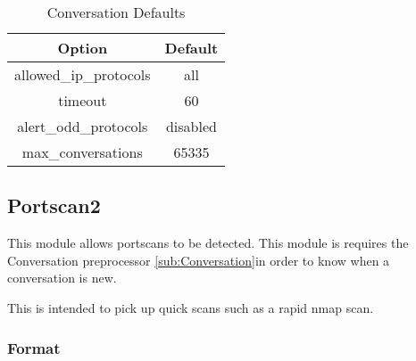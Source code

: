 \documentclass[english]{report}
\begin{document}
\begin{table}[!hbpt]

\caption{Conversation Defaults\label{conversation defaults}}

\begin{center}\begin{tabular}{|c|c|}
\hline 
Option&
Default\\
\hline
\hline 
allowed\_ip\_protocols&
all\\
\hline 
timeout&
60\\
\hline 
alert\_odd\_protocols&
disabled\\
\hline 
max\_conversations&
65335\\
\hline
\end{tabular}\end{center}
\end{table}

\subsection{Portscan2\label{sub:Portscan2}}

This module allows portscans to be detected. This module is requires
the Conversation preprocessor \ref{sub:Conversation}in order to know
when a conversation is new. 

This is intended to pick up quick scans such as a rapid nmap scan. 


\subsubsection{Format}
\end{document}
